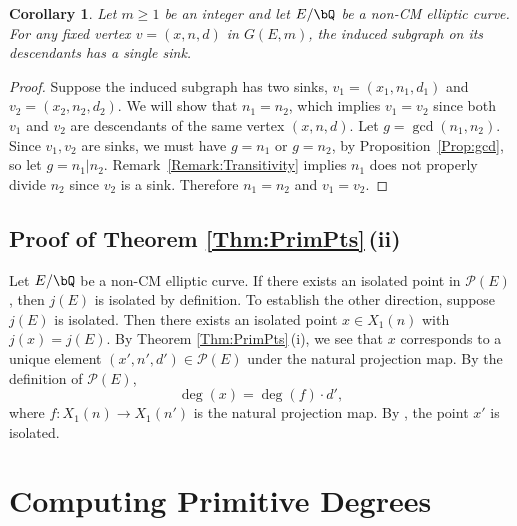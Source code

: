 \documentclass[11pt,reqno]{amsart}
\theoremstyle{plain}
\newtheorem{corollary}[theorem]{Corollary}
\theoremstyle{definition}
\newcommand{\Q}{\bQ}
\newcommand{\Z}{\bZ}
\newcommand{\sachi}[1]{\textcolor{purple}{Sachi: #1}}
\newcommand{\travis}[1]{\textcolor{orange}{Travis: #1}}
\begin{document}
\begin{corollary}\label{Cor:SingleSink}
   Let $m\geq 1$ be an integer and let $E/\Q$ be a non-CM elliptic curve. For any fixed vertex $v=(x,n,d)$ in $G(E,m)$, the induced subgraph on its descendants has a single sink.
\end{corollary}

\begin{proof}
Suppose the induced subgraph has two sinks, $v_1=(x_1,n_1,d_1)$ and $v_2=(x_2,n_2,d_2)$. We will show that $n_1=n_2$, which implies $v_1=v_2$ since both $v_1$ and $v_2$ are descendants of the same vertex $(x,n,d)$. Let $g=\gcd(n_1,n_2)$. Since $v_1,v_2$ are sinks, we must have $g=n_1$ or $g=n_2$, by Proposition~\ref{Prop:gcd}, so let $g=n_1|n_2$. Remark~\ref{Remark:Transitivity} implies $n_1$ does not properly divide $n_2$ since $v_2$ is a sink. Therefore $n_1=n_2$ and $v_1=v_2$. 
\end{proof}

\subsection{Proof of Theorem \ref{Thm:PrimPts}\,(ii)} Let $E/\Q$ be a non-CM elliptic curve. If there exists an isolated point in $\mathcal{P}(E)$, then $j(E)$ is isolated by definition. To establish the other direction, suppose $j(E)$ is isolated. Then there exists an isolated point $x \in X_1(n)$ with $j(x)=j(E)$. By Theorem \ref{Thm:PrimPts}\,(i), we see that $x$ corresponds to a unique element $(x',n',d') \in \mathcal{P}(E)$ under the natural projection map. By the definition of $\mathcal{P}(E)$,
\[
\deg(x)=\deg(f)\cdot d',
\]
where $f\colon X_1(n) \rightarrow X_1(n')$ is the natural projection map. By \cite[Theorem 4.3]{BELOV}, the point $x'$ is isolated.






\section{Computing Primitive Degrees}
\label{sec:primitivedeg}
\end{document}
